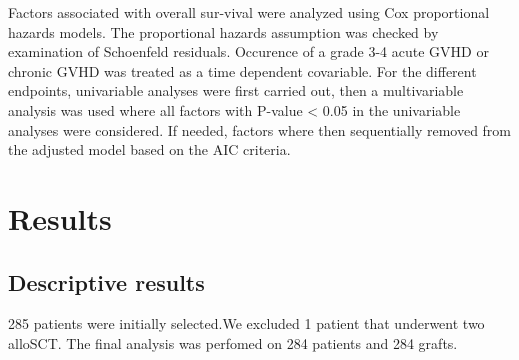 \documentclass[a4paper,11pt] {article}
\begin{document}
Factors associated with overall sur-vival were analyzed using Cox proportional hazards models. The proportional hazards assumption was checked by examination of Schoenfeld residuals. Occurence of a grade 3-4 acute GVHD or chronic GVHD was treated as a time dependent covariable.
For the different endpoints, univariable analyses were first carried out, then a multivariable analysis was used where all factors with P-value < 0.05 in the univariable analyses were considered. If needed, factors where then sequentially removed from the adjusted model based on the AIC criteria. 




\pagebreak[4]
\section{Results}





\subsection{Descriptive results}
 285 patients were initially selected.We excluded 1 patient that underwent two alloSCT. The final analysis was perfomed on 284 patients and 284 grafts.
\end{document}

